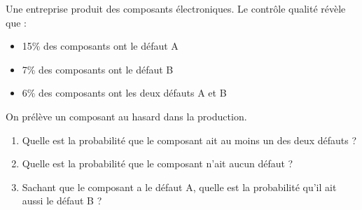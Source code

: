 {\begin{Exercice}
Une entreprise produit des composants électroniques. Le contrôle qualité révèle que :
\begin{itemize}[label=\textcolor{Couleur6}{$\bullet$}]
\item 15\% des composants ont le défaut A
\item 7\% des composants ont le défaut B  
\item 6\% des composants ont les deux défauts A et B
\end{itemize}
On prélève un composant au hasard dans la production.
\begin{enumerate}
\item Quelle est la probabilité que le composant ait au moins un des deux défauts ?
\item Quelle est la probabilité que le composant n'ait aucun défaut ?
\item Sachant que le composant a le défaut A, quelle est la probabilité qu'il ait aussi le défaut B ?
\end{enumerate}
\end{Exercice}












}
